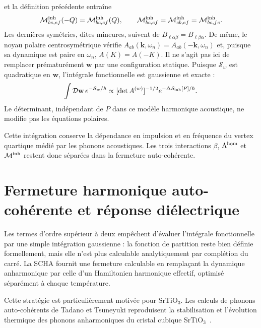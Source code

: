 et la définition précédente entraîne
\begin{equation}
\mathcal M^{\rm inh}_{bc,ef}(-Q)=\mathcal M^{\rm inh}_{bc,ef}(Q),
\qquad
\mathcal M^{\rm inh}_{bc,ef}
=\mathcal M^{\rm inh}_{cb,ef}
=\mathcal M^{\rm inh}_{bc,fe}.
\label{eq:core_inhomogeneous_vertex_parity}
\end{equation}
Les dernières symétries, dites mineures, suivent de
$B_{\ell\alpha\beta}=B_{\ell\beta\alpha}$. De même, le noyau polaire
centrosymétrique vérifie
$A_{ab}(\mathbf k,\omega_n)=A_{ab}(-\mathbf k,\omega_n)$ et, puisque sa
dynamique est paire en $\omega_n$, $A(K)=A(-K)$.
Il ne s'agit pas ici de remplacer prématurément $\mathbf w$ par une
configuration statique. Puisque $\mathcal S_w$ est quadratique en $\mathbf w$,
l'intégrale fonctionnelle est gaussienne et exacte :
\begin{equation}
\int\mathcal D\mathbf w\,e^{-\mathcal S_w/\hbar}
\propto[\det A^{(w)}]^{-1/2}
e^{-\Delta\mathcal S_{\rm inh}[P]/\hbar}.
\label{eq:core_acoustic_gaussian_integral}
\end{equation}
Le déterminant, indépendant de $P$ dans ce modèle harmonique acoustique, ne
modifie pas les équations polaires.

Cette intégration conserve la dépendance en impulsion et en fréquence du
vertex quartique médié par les phonons acoustiques. Les trois interactions
$\beta$, $\Lambda^{\rm hom}$ et $\mathcal M^{\rm inh}$ restent donc séparées
dans la fermeture auto-cohérente.

\section{Fermeture harmonique auto-cohérente et réponse diélectrique}
\label{ann:scha_reponse}

Les termes d'ordre supérieur à deux empêchent d'évaluer l'intégrale
fonctionnelle par une simple intégration gaussienne : la fonction de partition
reste bien définie formellement, mais elle n'est plus calculable analytiquement
par complétion du carré. La SCHA fournit une fermeture calculable en remplaçant
la dynamique anharmonique par celle d'un Hamiltonien harmonique effectif,
optimisé séparément à chaque température.

Cette stratégie est particulièrement motivée pour SrTiO$_3$. Les calculs de
phonons auto-cohérents de Tadano et Tsuneyuki reproduisent la stabilisation et
l'évolution thermique des phonons anharmoniques du cristal cubique
SrTiO$_3$~\cite{TadanoTsuneyuki2015}.


